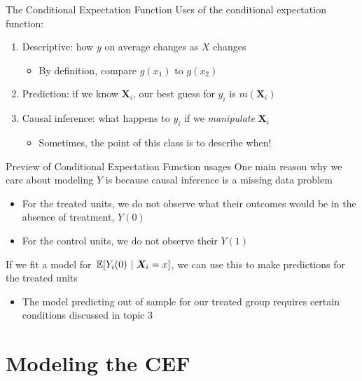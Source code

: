 \documentclass[aspectratio=169,t,11pt,table]{beamer}
\begin{document}
\begin{frame}{The Conditional Expectation Function}
  Uses of the conditional expectation function:
  \begin{enumerate}
    \item \alert{Descriptive}: how $y$ on average changes as $X$ changes 
    \begin{itemize}
      \item By definition, compare $g(x_1)$ to $g(x_2)$
    \end{itemize} 

    \bigskip
    \item \alert{Prediction}: if we know $\bm{X}_i$, our best guess for $y_i$ is $m(\bm{X}_i)$ 
    
    \bigskip
    \item \alert{Causal inference}: what happens to $y_i$ if we \emph{manipulate} $\bm{X}_i$ 
    \begin{itemize}
      \item Sometimes, the point of this class is to describe when! 
    \end{itemize}
  \end{enumerate}
\end{frame}


\begin{frame}{Preview of Conditional Expectation Function usages}
  One main reason why we care about modeling $Y$ is because causal inference is a missing data problem
  \begin{itemize}
    \item For the treated units, we do not observe what their outcomes would be in the absence of treatment, $Y(0)$
    \item For the control units, we do not observe their $Y(1)$
  \end{itemize}

  \pause
  \bigskip
  If we fit a model for $\expec{Y_i(0)}{\bm{X}_i = x}$, we can use this to make predictions for the treated units 
  
  \pause
  \begin{itemize}
    \item The model predicting out of sample for our treated group requires certain conditions discussed in topic 3
  \end{itemize}
\end{frame}

\section{Modeling the CEF}
\end{document}
